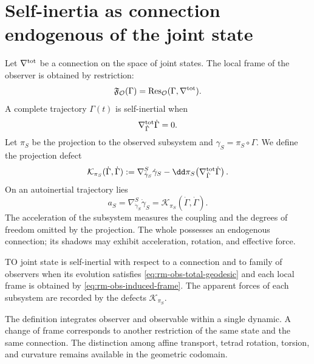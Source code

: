\section{Self-inertia as connection endogenous of the joint state}

Let \(\nabla^{\rm tot}\) be a connection on the space of joint states.
The local frame of the observer is obtained by restriction:
\begin{equation}
 \mathfrak F_{\mathcal O}(\Gamma)
 =\operatorname{Res}_{\mathcal O}
 (\Gamma,\nabla^{\rm tot}).
 \label{eq:rm-obs-induced-frame}
\end{equation}
A complete trajectory \(\Gamma(t)\) is self-inertial when
\begin{equation}
 \nabla^{\rm tot}_{\dot\Gamma}\dot\Gamma=0.
 \label{eq:rm-obs-total-geodesic}
\end{equation}
Let \(\pi_S\) be the projection to the observed subsystem and
\(\gamma_S=\pi_S\circ\Gamma\). We define the projection defect
\begin{equation}
 \mathcal K_{\pi_S}(\dot\Gamma,\dot\Gamma)
 :=\nabla^S_{\dot\gamma_S}\dot\gamma_S
 -\dd\pi_S\!\left(
 \nabla^{\rm tot}_{\dot\Gamma}\dot\Gamma
 \right).
 \label{eq:rm-obs-projection-defect}
\end{equation}
On an autoinertial trajectory lies
\begin{equation}
 \boxed{
 a_S=\nabla^S_{\dot\gamma_S}\dot\gamma_S
 =\mathcal K_{\pi_S}(\dot\Gamma,\dot\Gamma).}
 \label{eq:rm-obs-projected-acceleration}
\end{equation}
The acceleration of the subsystem measures the coupling and the degrees of freedom
omitted by the projection. The whole possesses an endogenous connection;
its shadows may exhibit acceleration, rotation, and effective force.

\begin{definition}
TO joint state is self-inertial with respect to a connection and to family
of observers when its evolution satisfies
\cref{eq:rm-obs-total-geodesic} and each local frame is obtained by
\cref{eq:rm-obs-induced-frame}. The apparent forces of each subsystem are
recorded by the defects \(\mathcal K_{\pi_S}\).
\end{definition}

The definition integrates observer and observable within a single dynamic.
A change of frame corresponds to another restriction of the same state and the
same connection. The distinction among affine transport, tetrad rotation,
torsion, and curvature remains available in the geometric codomain.

